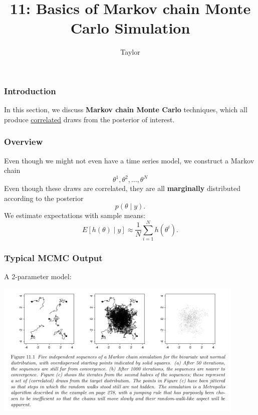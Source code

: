 \documentclass{beamer}
\title["11"]{11: Basics of Markov chain Monte Carlo Simulation}
\author{Taylor}
\institute[UVA] 
{
University of Virginia \\
\medskip
\textit{} 
}
\date{}
\begin{document}

\begin{frame}
\titlepage 
\end{frame}

\begin{frame}
\frametitle{Introduction}

In this section, we discuss {\bf Markov chain Monte Carlo} techniques, which all produce \underline{correlated} draws from the posterior of interest.


\end{frame}

\begin{frame}
\frametitle{Overview}

Even though we might not even have a time series model, we construct a Markov chain 
$$
\theta^1, \theta^2, \ldots, \theta^N
$$
Even though these draws are correlated, they are all {\bf marginally} distributed according to the posterior 
$$
p(\theta \mid y).
$$
We estimate expectations with sample means:
$$
E[h(\theta) \mid y] \approx  \frac{1}{N}\sum_{i=1}^N h(\theta^i).
$$
\end{frame}

\begin{frame}
\frametitle{Typical MCMC Output}

A 2-parameter model:
\begin{center}
\includegraphics[width=120mm]{fig11.png}
\end{center}

\end{frame}
\end{document}
